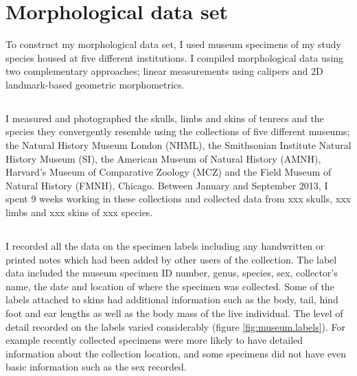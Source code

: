 \section{Morphological data set}
To construct my morphological data set, I used museum specimens of my study species housed at five different institutions. I compiled morphological data using two complementary approaches; linear measurements using calipers and 2D landmark-based geometric morphometrics.

\subsection{}

I measured and photographed the skulls, limbs and skins of tenrecs and the species they convergently resemble using the collections of five different museums; the Natural History Museum London (NHML), the Smithsonian Institute Natural History Museum (SI), the American Museum of Natural History (AMNH), Harvard’s Museum of Comparative Zoology (MCZ) and the Field Museum of Natural History (FMNH), Chicago. Between January and September 2013, I spent 9 weeks working in these collections and collected data from xxx skulls, xxx limbs and xxx skins of xxx species. 

\subsection{}
I recorded all the data on the specimen labels including any handwritten or printed notes which had been added by other users of the collection. The label data included the museum specimen ID number, genus, species, sex, collector’s name, the date and location of where the specimen was collected. Some of the labels attached to skins had additional information such as the body, tail, hind foot and ear lengths as well as the body mass of the live individual. 
The level of detail recorded on the labels varied considerably (figure \ref{fig:museum.labels}). For example recently collected specimens were more likely to have detailed information about the collection location, and some specimens did not have even basic information such as the sex recorded. 



